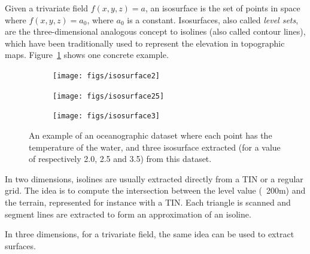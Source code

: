 Given a trivariate field $f(x,y,z) = a$, an isosurface is the set of points in space where $f(x,y,z) = a_0$, where $a_0$ is a constant. 
Isosurfaces, also called \emph{level sets}, 
are the three-dimensional analogous concept to isolines (also called contour lines), which have been traditionally used to represent the elevation in topographic maps. 
Figure~\ref{fig:isosurface} shows one concrete example.
\begin{figure}
  \centering
  \begin{subfigure}[b]{0.3\linewidth}
    \centering
    \texttt{[image: figs/isosurface2]}
    \caption{}
  \end{subfigure}%
  \quad
  \begin{subfigure}[b]{0.3\linewidth}
    \centering
    \texttt{[image: figs/isosurface25]}
    \caption{}
  \end{subfigure}
  \quad
  \begin{subfigure}[b]{0.3\linewidth}
    \centering
    \texttt{[image: figs/isosurface3]}
    \caption{}
  \end{subfigure}
\caption{An example of an oceanographic dataset where each point has the temperature of the water, and three isosurface extracted (for a value of respectively 2.0, 2.5 and 3.5) from this dataset.}%
\label{fig:isosurface}
\end{figure}

%

In two dimensions, isolines are usually extracted directly from a TIN or a regular grid. 
The idea is to compute the intersection between the level value (\eg\ 200m) and the terrain, represented for instance with a TIN\@. 
Each triangle is scanned and segment lines are extracted to form an approximation of an isoline.

%

In three dimensions, for a trivariate field, the same idea can be used to extract surfaces.

%

